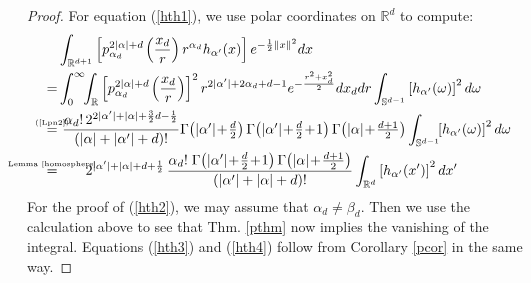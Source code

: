 \documentclass{amsart}
\newcommand{\p}[2]{p_{#1}^{#2}\;\!\!}
\newcommand{\myeq}[1]{\mathrel{\overset{\makebox[0pt]{\text{\tiny #1}}}{=}}}
\newcommand{\R}{\mathbb{R}}
\renewcommand{\S}{\mathbb{S}}
\theoremstyle{plain}
\theoremstyle{definition}
\theoremstyle{remark}
\begin{document}
\begin{proof}
For equation (\ref{hth1}), we use polar coordinates on $\R ^d$ to compute:
\begin{align*}
 &\int_{\R^{d+1}}\left[\p{\alpha_d}{2|\alpha|+d}\left(\frac{x_d}{r}\right) r^{\alpha_d}h_{\alpha'}(x)\right] e^{-\frac{1}{2}\|x\|^2} dx \\
 = & \int_0^\infty\!\!\int_{\R} \left[\p{\alpha_d}{2|\alpha|+d}\left(\frac{x_d}{r}\right)\right]^2 r^{2|\alpha'|+2\alpha_d+d-1} e^{-\frac{r^2+x_d^2}{2} }dx_ddr\int_{\S^{d-1}}\left[h_{\alpha'}(\omega)\right]^2 d\omega \\
\myeq{(\ref{Lpn2})}& \  \frac{\alpha_d!\, 2^{2|\alpha '|+|\alpha|+\frac{3}{2}d-\frac{1}{2}} }{\left(|\alpha|+|\alpha'|+d\right)!} { \textstyle
\Gamma\!\left( |\alpha'| \!+\!\frac{d}{2}\right)\Gamma\!\left( |\alpha'|\!+\! \frac{d}{2}\!+\! 1\right) \Gamma\!\left( |\alpha| \!+\! \frac{d+1}{2}\right) }\int_{\S^{d-1}}\!\!\left[h_{\alpha'}(\omega)\right]^2 d\omega \\
\myeq{Lemma \ref{homosphere}}&\quad\quad 2^{|\alpha '|+|\alpha |+d+\frac{1}{2}}\,
\frac{\alpha_d!\;\Gamma\!\left(|\alpha '|\!+\!\frac{d}{2}\!+\!1\right)\Gamma\!\left(|\alpha |\!+\!\tfrac{d+1}{2}\right)}{\left(|\alpha '|+|\alpha |+d\right)!} \int_{\R^d} \left[h_{\alpha'}(x')\right]^2 dx'
\end{align*}
For the proof of (\ref{hth2}), we may assume that $\alpha_d \neq \beta_d$. Then we use the calculation above to see that Thm. \ref{pthm} now implies the vanishing of the integral. Equations (\ref{hth3}) and (\ref{hth4}) follow from Corollary \ref{pcor} in the same way.
\end{proof}




\end{document}
